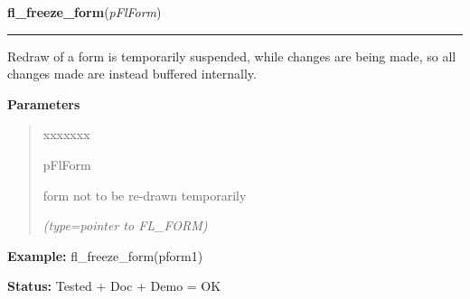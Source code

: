 \hspace{.8\funcindent}\begin{boxedminipage}{\funcwidth}

    \raggedright \textbf{fl\_freeze\_form}(\textit{pFlForm})

    \vspace{-1.5ex}

    \rule{\textwidth}{0.5\fboxrule}
\setlength{\parskip}{2ex}
    Redraw of a form is temporarily suspended, while changes are being 
    made, so all changes made are instead buffered internally.

\setlength{\parskip}{1ex}
      \textbf{Parameters}
      \vspace{-1ex}

      \begin{quote}
        \begin{Ventry}{xxxxxxx}

          \item[pFlForm]

          form not to be re-drawn temporarily

            {\it (type=pointer to FL\_FORM)}

        \end{Ventry}

      \end{quote}

\textbf{Example:} fl\_freeze\_form(pform1)



\textbf{Status:} Tested + Doc + Demo = OK



    \end{boxedminipage}

    \label{xformslib:flbasic:fl_set_focus_object}

    \vspace{0.5ex}

